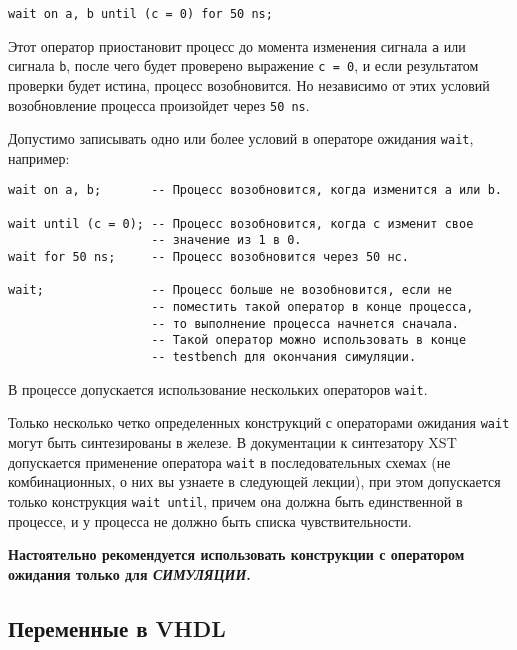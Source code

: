 
\begin{Code}
\begin{lstlisting}
wait on a, b until (c = 0) for 50 ns;
\end{lstlisting}
\end{Code}

Этот оператор приостановит процесс до момента изменения сигнала \lstinline?a? или сигнала \lstinline?b?, после чего будет проверено выражение \lstinline?c = 0?, и если результатом проверки будет истина, процесс возобновится. Но независимо от этих условий возобновление процесса произойдет через \lstinline?50 ns?.

Допустимо записывать одно или более условий в операторе ожидания \lstinline?wait?, например:

\begin{Code}
\begin{lstlisting}
wait on a, b;       -- Процесс возобновится, когда изменится a или b.

wait until (c = 0); -- Процесс возобновится, когда c изменит свое 
                    -- значение из 1 в 0.
wait for 50 ns;     -- Процесс возобновится через 50 нс.

wait;               -- Процесс больше не возобновится, если не 
                    -- поместить такой оператор в конце процесса, 
                    -- то выполнение процесса начнется сначала. 
                    -- Такой оператор можно использовать в конце 
                    -- testbench для окончания симуляции.
\end{lstlisting}
\end{Code}

В процессе допускается использование нескольких операторов \lstinline?wait?.

 Только несколько четко определенных конструкций с операторами ожидания \lstinline?wait? могут быть синтезированы в железе. В документации к синтезатору XST допускается применение оператора \lstinline?wait? в последовательных схемах (не комбинационных, о них вы узнаете в следующей лекции), при этом допускается только конструкция \lstinline?wait until?, причем она должна быть единственной в процессе, и у процесса не должно быть списка чувствительности.

\textbf{Настоятельно рекомендуется использовать конструкции с оператором ожидания только для \emph{СИМУЛЯЦИИ}.}

\subsection{Переменные в VHDL}

